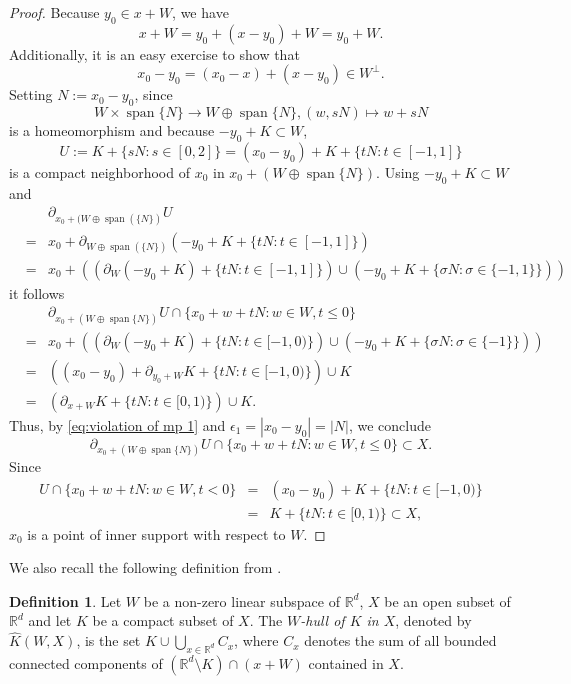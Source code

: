 \documentclass[a4paper,10pt]{amsart}
\newtheorem*{crucial lemma}{Lemma \ref{lem:nice polynomial2}}
\theoremstyle{definition}
\newtheorem{definition}[theorem]{Definition}
\newcommand{\R}{\mathbb{R}}
\begin{document}
\begin{proof}
    Because $y_0\in x+W$, we have
    \[x+W=y_0+(x-y_0)+W=y_0+W.\]
    Additionally, it is an easy exercise to show that
    \[x_0-y_0=(x_0-x)+(x-y_0)\in W^\perp.\]
    Setting $N:=x_0-y_0$,
    since
    \[W\times\operatorname{span}\{N\}\rightarrow W\oplus\operatorname{span}\{N\},(w,sN)\mapsto w+sN\]
    is a homeomorphism and because $-y_0+K\subset W$,
    \[U:=K+\{sN\colon s\in [0,2]\}=(x_0-y_0)+K+\{tN\colon t\in[-1,1]\}\]
    is a compact neighborhood of $x_0$ in $x_0+(W\oplus\operatorname{span}\{N\})$. Using $-y_0+K\subset W$ and
    \begin{eqnarray*}
        &&\partial_{x_0+(W\oplus\operatorname{span}(\{N\})}U\\
        &=&x_0+\partial_{W\oplus\operatorname{span}(\{N\})}\left(-y_0+K+\{tN\colon t\in [-1,1]\}\right)\\
        &=&x_0+\left(\left(\partial_W\left(-y_0+K\right)+\{tN\colon t\in[-1,1]\}\right)\cup\left(-y_0+K+\{\sigma N\colon\sigma\in\{-1,1\}\}\right)\right)
    \end{eqnarray*}
    it follows
    \begin{eqnarray*}
        &&\partial_{x_0+(W\oplus\operatorname{span}\{N\})}U\cap\{x_0+w+tN\colon w\in W, t\leq 0\}\\
        &=&x_0+\left(\left(\partial_W\left(-y_0+K\right)+\{tN\colon t\in[-1,0)\}\right)\cup\left(-y_0+K+\{\sigma N\colon\sigma\in\{-1\}\}\right)\right)\\
        &=&\left((x_0-y_0)+\partial_{y_0+W}K+\{tN\colon t\in[-1,0)\}\right)\cup K\\
        &=&\left(\partial_{x+W}K+\{tN\colon t\in [0,1)\}\right)\cup K.
    \end{eqnarray*}
    Thus, by \eqref{eq:violation of mp 1} and $\epsilon_1=|x_0-y_0|=|N|$, we conclude
    \[\partial_{x_0+(W\oplus\operatorname{span}\{N\})}U\cap\{x_0+w+tN\colon w\in W, t\leq 0\}\subset X.\]
    Since
    \begin{eqnarray*}
        U\cap\{x_0+w+tN\colon w\in W, t<0\}&=&(x_0-y_0)+K+\{tN\colon t\in [-1,0)\}\\
        &=&K+\{tN\colon t\in[0,1)\}\subset X,
    \end{eqnarray*}
    $x_0$ is a point of inner support with respect to $W$.
\end{proof}

We also recall the following definition from \cite[Introduction]{Zachmanoglou69}.
\begin{definition}\label{def:W-hull}
Let $W$ be a non-zero linear subspace of $\R^d$, $X$ be an open subset of $\R^d$ and let $K$ be a compact subset of $X$. The \emph{$W$-hull of $K$ in $X$}, denoted by $\widehat{K}(W,X)$, is the set $K\cup \bigcup_{x\in\R^d}C_x$, where $C_x$ denotes the sum of all bounded connected components of $(\R^d\setminus K)\cap (x+W)$ contained in $X$.
\end{definition}
\end{document}
